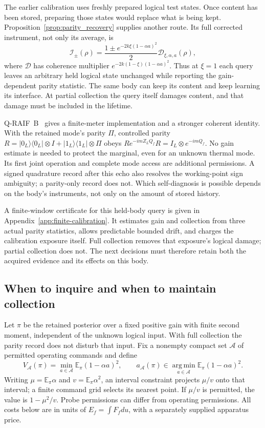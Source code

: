 \documentclass[11pt]{article}
\theoremstyle{definition}
\theoremstyle{remark}
\begin{document}
The earlier calibration uses freshly prepared logical test states. Once content
has been stored, preparing those states would replace what is being kept.
Proposition~\ref{prop:parity_recovery} supplies another route. Its full corrected
instrument, not only its average, is
\[
 \mathcal I_\pm(\rho)=
 \frac{1\pm e^{-2k\xi(1-\alpha a)^2}}2\mathcal D_{\xi,\alpha,a}(\rho),
\]
where $\mathcal D$ has coherence multiplier
$e^{-2k(1-\xi)(1-\alpha a)^2}$. Thus at $\xi=1$ each query leaves an
arbitrary held logical state unchanged while reporting the gain-dependent
parity statistic. The same body can keep its content and keep learning its
interface. At partial collection the query itself damages content, and that
damage must be included in the lifetime.

Q-RAIF~B~\cite{QRAIFB} gives a finite-meter implementation and a stronger
coherent identity. With the retained mode's parity $\Pi$, controlled parity
$R=|0_L\rangle\langle0_L|\otimes I+|1_L\rangle\langle1_L|\otimes\Pi$
obeys $R e^{-imZ_LQ_f}R=I_L\otimes e^{-imQ_f}$. No gain estimate is
needed to protect the marginal, even for an unknown thermal mode. Its first
joint operation and complete mode access are additional permissions. A signed
quadrature record after this echo also resolves the working-point sign
ambiguity; a parity-only record does not. Which self-diagnosis is possible
depends on the body's instruments, not only on the amount of stored history.

A finite-window certificate for this held-body query is given in
Appendix~\ref{app:finite-calibration}. It estimates gain and collection
from three actual parity statistics, allows predictable bounded drift,
and charges the calibration exposure itself. Full collection removes
that exposure's logical damage; partial collection does not.
The next decisions must therefore retain both the acquired evidence
and its effects on this body.

\subsection{When to inquire and when to maintain collection}
\label{sec:quantum-inquiry-price}

Let $\pi$ be the retained posterior over a fixed positive gain with finite
second moment, independent of
the unknown logical input. With full collection the parity record does not
disturb that input. Fix a nonempty compact set $\mathcal A$ of permitted
operating commands and define
\[
 V_{\mathcal A}(\pi)=\min_{a\in\mathcal A}
       \mathbb E_\pi(1-\alpha a)^2,\qquad
 a_{\mathcal A}(\pi)\in\operatorname*{arg\,min}_{a\in\mathcal A}
       \mathbb E_\pi(1-\alpha a)^2.
\]
Writing $\mu=\mathbb E_\pi\alpha$ and $v=\mathbb E_\pi\alpha^2$,
an interval constraint projects $\mu/v$ onto that interval; a finite command
grid selects its nearest point. If $\mu/v$ is permitted, the value is
$1-\mu^2/v$. Probe permissions can differ from operating permissions.
All costs below are in units of $E_f=\int F_fdu$, with a separately
supplied apparatus price.
\end{document}
